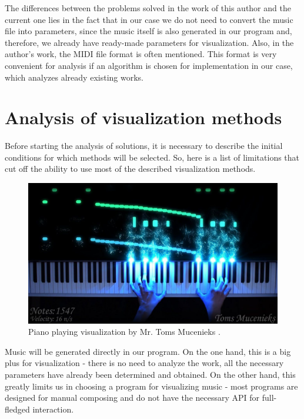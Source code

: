 \documentclass[thesis=B,english]{FITthesis}[2019/12/23]
\begin{document}
The differences between the problems solved in the work of this author and the current one lies in the fact that in our case we do not need to convert the music file into parameters, since the music itself is also generated in our program and, therefore, we already have ready-made parameters for visualization. Also, in the author's work, the MIDI file format is often mentioned. This format is very convenient for analysis if an algorithm is chosen for implementation in our case, which analyzes already existing works.

\section{Analysis of visualization methods}

Before starting the analysis of solutions, it is necessary to describe the initial conditions for which methods will be selected. So, here is a list of limitations that cut off the ability to use most of the described visualization methods.

\begin{figure}[ht]
            \includegraphics[width=\textwidth]{Pirates.jpg}
            \caption[Toms Mucenieks visualization]{Piano playing visualization by Mr. Toms Mucenieks \cite{TomsMucenieks}.}
            \label{fig:PiratesOfTheCaribean}
\end{figure}

Music will be generated directly in our program. On the one hand, this is a big plus for visualization - there is no need to analyze the work, all the necessary parameters have already been determined and obtained. On the other hand, this greatly limits us in choosing a program for visualizing music - most programs are designed for manual composing and do not have the necessary API for full-fledged interaction.
\end{document}
